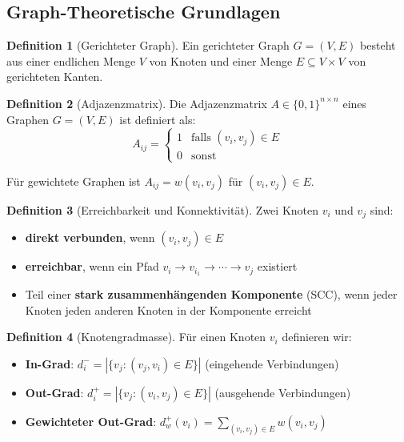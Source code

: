 \documentclass[a4paper,12pt]{article}
\theoremstyle{definition}
\newtheorem{definition}{Definition}
\begin{document}
\subsection{Graph-Theoretische Grundlagen}

\begin{definition}[Gerichteter Graph]
Ein gerichteter Graph $G = (V, E)$ besteht aus einer endlichen Menge $V$ von Knoten und einer Menge $E \subseteq V \times V$ von gerichteten Kanten.
\end{definition}

\begin{definition}[Adjazenzmatrix]
Die Adjazenzmatrix $A \in \{0,1\}^{n \times n}$ eines Graphen $G = (V, E)$ ist definiert als:
\[
A_{ij} = \begin{cases}
1 & \text{falls } (v_i, v_j) \in E \\
0 & \text{sonst}
\end{cases}
\]

Für gewichtete Graphen ist $A_{ij} = w(v_i, v_j)$ für $(v_i, v_j) \in E$.
\end{definition}

\begin{definition}[Erreichbarkeit und Konnektivität]
Zwei Knoten $v_i$ und $v_j$ sind:
\begin{itemize}
	\item \textbf{direkt verbunden}, wenn $(v_i, v_j) \in E$
	\item \textbf{erreichbar}, wenn ein Pfad $v_i \to v_{i_1} \to \cdots \to v_j$ existiert
	\item Teil einer \textbf{stark zusammenhängenden Komponente} (SCC), wenn jeder Knoten jeden anderen Knoten in der Komponente erreicht
\end{itemize}
\end{definition}

\begin{definition}[Knotengradmasse]
Für einen Knoten $v_i$ definieren wir:
\begin{itemize}
	\item \textbf{In-Grad}: $d^-_i = |\{v_j : (v_j, v_i) \in E\}|$ (eingehende Verbindungen)
	\item \textbf{Out-Grad}: $d^+_i = |\{v_j : (v_i, v_j) \in E\}|$ (ausgehende Verbindungen)
	\item \textbf{Gewichteter Out-Grad}: $d^+_w(v_i) = \sum_{(v_i, v_j) \in E} w(v_i, v_j)$
\end{itemize}
\end{definition}
\end{document}
